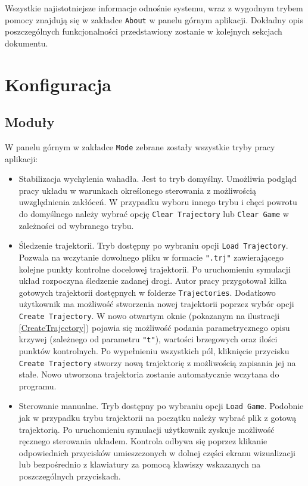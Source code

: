 \documentclass[12pt, oneside]{report}
\theoremstyle{definition}
\begin{document}
Wszystkie najistotniejsze informacje odnośnie systemu, wraz z wygodnym trybem pomocy znajdują się w zakładce \texttt{About} w panelu górnym aplikacji. Dokładny opis poszczególnych funkcjonalności przedstawiony zostanie w kolejnych sekcjach dokumentu.

\section{Konfiguracja}
\subsection{Moduły}
W panelu górnym w zakładce \texttt{Mode} zebrane zostały wszystkie tryby pracy aplikacji:
\begin{itemize}
\item Stabilizacja wychylenia wahadła. Jest to tryb domyślny. Umożliwia podgląd pracy układu w warunkach określonego sterowania z możliwością uwzględnienia zakłóceń. W przypadku wyboru innego trybu i chęci powrotu do domyślnego należy wybrać opcję \texttt{Clear Trajectory} lub \texttt{Clear Game} w zależności od wybranego trybu.
\item Śledzenie trajektorii. Tryb dostępny po wybraniu opcji \texttt{Load Trajectory}. Pozwala na wczytanie dowolnego pliku w formacie \texttt{".trj"} zawierającego kolejne punkty kontrolne docelowej trajektorii. Po uruchomieniu symulacji układ rozpoczyna śledzenie zadanej drogi. Autor pracy przygotował kilka gotowych trajektorii dostępnych w folderze \texttt{Trajectories}. Dodatkowo użytkownik ma możliwość stworzenia nowej trajektorii poprzez wybór opcji \texttt{Create Trajectory}. W nowo otwartym oknie (pokazanym na ilustracji \ref{CreateTrajectory}) pojawia się możliwość podania parametrycznego opisu krzywej (zależnego od parametru \texttt{"t"}), wartości brzegowych oraz ilości punktów kontrolnych. Po wypełnieniu wszystkich pól, kliknięcie przycisku \texttt{Create Trajectory} stworzy nową trajektorię z możliwością zapisania jej na stałe. Nowo utworzona trajektoria zostanie automatycznie wczytana do programu.
\item Sterowanie manualne. Tryb dostępny po wybraniu opcji \texttt{Load Game}. Podobnie jak w przypadku trybu trajektorii na początku należy wybrać plik z gotową trajektorią. Po uruchomieniu symulacji użytkownik zyskuje możliwość ręcznego sterowania układem. Kontrola odbywa się poprzez klikanie odpowiednich przycisków umieszczonych w dolnej części ekranu wizualizacji lub bezpośrednio z klawiatury za pomocą klawiszy wskazanych na poszczególnych przyciskach.
\end{itemize}
\end{document}
